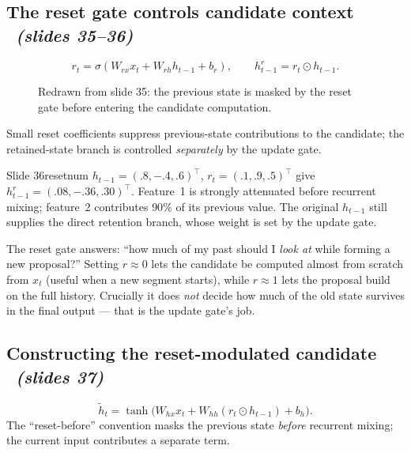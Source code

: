 \documentclass[11pt,a4paper]{article}
\newcommand{\thh}{\tilde h}
\newcommand{\sltag}[1]{\texorpdfstring{\ \emph{(slides #1)}}{ (slides #1)}}
\begin{document}
\subsection{The reset gate controls candidate context \sltag{35--36}}

\[
r_t=\sigma(W_{rx}x_t+W_{rh}h_{t-1}+b_r),\qquad h^r_{t-1}=r_t\odot h_{t-1}.
\]
\begin{figure}[H]\centering
{}
\caption{Redrawn from slide 35: the previous state is masked by the reset gate before entering the candidate computation.}
\end{figure}

Small reset coefficients suppress previous-state contributions to the candidate; the retained-state branch is controlled \emph{separately} by the update gate.

\begin{example}{Slide 36}{resetnum}
$h_{t-1}=(.8,-.4,.6)^\top$, $r_t=(.1,.9,.5)^\top$ give $h^r_{t-1}=(.08,-.36,.30)^\top$. Feature~1 is strongly attenuated before recurrent mixing; feature~2 contributes $90\%$ of its previous value. The original $h_{t-1}$ still supplies the direct retention branch, whose weight is set by the update gate.
\end{example}

\begin{intuition}
The reset gate answers: ``how much of my past should I \emph{look at} while forming a new proposal?'' Setting $r\approx0$ lets the candidate be computed almost from scratch from $x_t$ (useful when a new segment starts), while $r\approx1$ lets the proposal build on the full history. Crucially it does \emph{not} decide how much of the old state survives in the final output --- that is the update gate's job.
\end{intuition}

\subsection{Constructing the reset-modulated candidate \sltag{37}}

\[
\thh_t=\tanh\big(W_{hx}x_t+W_{hh}(r_t\odot h_{t-1})+b_h\big).
\]
The ``reset-before'' convention masks the previous state \emph{before} recurrent mixing; the current input contributes a separate term.
\end{document}
